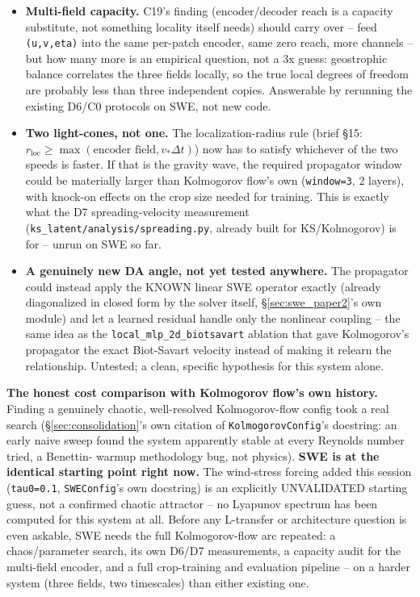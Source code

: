 \documentclass[11pt]{article}
\begin{document}
\begin{itemize}[leftmargin=*]
\item \textbf{Multi-field capacity.} C19's finding (encoder/decoder
  reach is a capacity substitute, not something locality itself needs)
  should carry over -- feed \texttt{(u,v,eta)} into the same per-patch
  encoder, same zero reach, more channels -- but how many more is an
  empirical question, not a 3x guess: geostrophic balance correlates the
  three fields locally, so the true local degrees of freedom are
  probably less than three independent copies. Answerable by rerunning
  the existing D6/C0 protocols on SWE, not new code.
\item \textbf{Two light-cones, not one.} The localization-radius rule
  (brief \S15: $r_{\mathrm{loc}} \ge \max(\text{encoder field},
  v_*\Delta t)$) now has to satisfy whichever of the two speeds is
  faster. If that is the gravity wave, the required propagator window
  could be materially larger than Kolmogorov flow's own
  (\texttt{window=3}, 2 layers), with knock-on effects on the crop size
  needed for training. This is exactly what the D7 spreading-velocity
  measurement (\texttt{ks\_latent/analysis/spreading.py}, already built
  for KS/Kolmogorov) is for -- unrun on SWE so far.
\item \textbf{A genuinely new DA angle, not yet tested anywhere.} The
  propagator could instead apply the KNOWN linear SWE operator exactly
  (already diagonalized in closed form by the solver itself,
  \S\ref{sec:swe_paper2}'s own module) and let a learned residual handle
  only the nonlinear coupling -- the same idea as the
  \texttt{local\_mlp\_2d\_biotsavart} ablation that gave Kolmogorov's
  propagator the exact Biot-Savart velocity instead of making it relearn
  the relationship. Untested; a clean, specific hypothesis for this
  system alone.
\end{itemize}

\textbf{The honest cost comparison with Kolmogorov flow's own history.}
Finding a genuinely chaotic, well-resolved Kolmogorov-flow config took a
real search (\S\ref{sec:consolidation}'s own citation of
\texttt{KolmogorovConfig}'s docstring: an early naive sweep found the
system apparently stable at every Reynolds number tried, a Benettin-
warmup methodology bug, not physics). \textbf{SWE is at the identical
starting point right now.} The wind-stress forcing added this session
(\texttt{tau0=0.1}, \texttt{SWEConfig}'s own docstring) is an explicitly
UNVALIDATED starting guess, not a confirmed chaotic attractor -- no
Lyapunov spectrum has been computed for this system at all. Before any
L-transfer or architecture question is even askable, SWE needs the full
Kolmogorov-flow arc repeated: a chaos/parameter search, its own D6/D7
measurements, a capacity audit for the multi-field encoder, and a full
crop-training and evaluation pipeline -- on a harder system (three
fields, two timescales) than either existing one.
\end{document}
